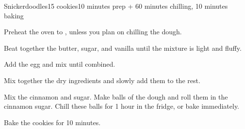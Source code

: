 \documentclass[../Cookbook.tex]{subfiles}
\begin{document}
\begin{recipe}{Snickerdoodles}{15 cookies}{10 minutes prep + 60 minutes chilling, 10 minutes baking}

Preheat the oven to , unless you plan on chilling the dough.

Beat together the butter, sugar, and vanilla until the mixture is light and fluffy.

Add the egg and mix until combined.

Mix together the dry ingredients and slowly add them to the rest.

Mix the cinnamon and sugar. Make balls of the dough and roll them in the cinnamon sugar. Chill these balls for 1 hour in the fridge, or bake immediately.

\newstep
Bake the cookies for 10 minutes.

\end{recipe}
\end{document}
